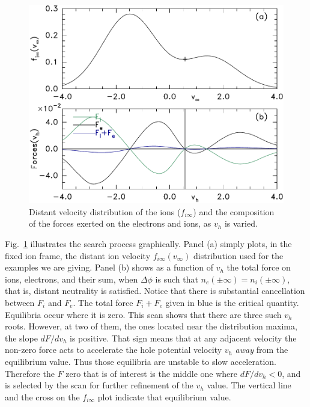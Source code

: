 \documentclass[12pt]{article}
\begin{document}
\begin{figure}[htp]
  \centering
  \includegraphics[width=0.6\hsize]{forceplot}
  \caption{Distant velocity distribution of the ions ($f_{i\infty}$)
    and the composition of the forces exerted on the electrons and
    ions, as $v_h$ is varied.}
  \label{fig:forceplot}
\end{figure}
Fig.\ \ref{fig:forceplot} illustrates the search process
graphically. Panel (a) simply plots, in the fixed ion frame, the
distant ion velocity $f_{i\infty}(v_\infty)$ distribution used for the
examples we are giving. Panel (b) shows as a function of $v_h$ the
total force on ions, electrons, and their sum, when $\Delta\phi$ is
such that $n_e(\pm\infty)=n_i(\pm\infty)$, that is, distant neutrality
is satisfied. Notice that there is substantial cancellation between
$F_i$ and $F_e$. The total force $F_i+F_e$ given in blue is the
critical quantity. Equilibria occur where it is zero. This scan shows
that there are three such $v_h$ roots. However, at two of them, the
ones located near the distribution maxima, the slope $dF/dv_h$ is
positive. That sign means that at any adjacent velocity the non-zero
force acts to accelerate the hole potential velocity $v_h$ \emph{away}
from the equilibrium value. Thus those equilibria are unstable to slow
acceleration. Therefore the $F$ zero that is of interest is the middle
one where $dF/dv_h<0$, and is selected by the scan for further
refinement of the $v_h$ value. The vertical line and the cross on the
$f_{i\infty}$ plot indicate that equilibrium value.
\end{document}
